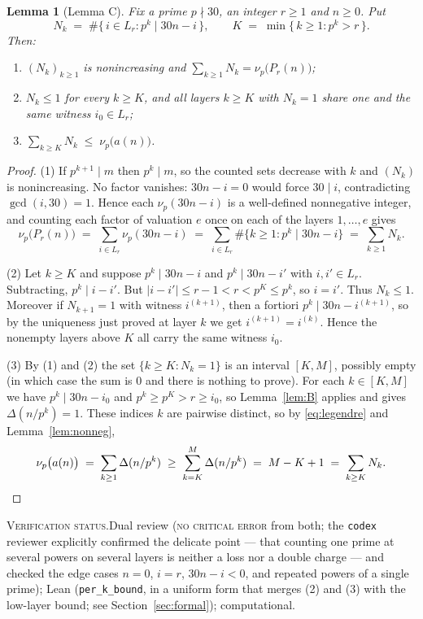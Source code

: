 \documentclass[11pt]{article}
\theoremstyle{plain}
\newtheorem{lemma}[theorem]{Lemma}
\theoremstyle{definition}
\theoremstyle{remark}
\numberwithin{equation}{section}
\newcommand{\Lr}{L_r}
\newcommand{\vstatus}[1]{%
  \par\vspace{3pt}\noindent
  {\small\textsc{Verification status.}\enspace #1}\par\vspace{3pt}}
\begin{document}
\begin{lemma}[Lemma C]
\label{lem:C}
Fix a prime $p \nmid 30$, an integer $r \ge 1$ and $n \ge 0$. Put
\[
  N_k \;=\; \#\{\, i \in \Lr : p^k \mid 30n - i \,\},
  \qquad
  K \;=\; \min\{\, k \ge 1 : p^k > r \,\} .
\]
Then:
\begin{enumerate}
\item $(N_k)_{k \ge 1}$ is nonincreasing and $\sum_{k \ge 1} N_k = \nu_p\bigl(P_r(n)\bigr)$;
\item $N_k \le 1$ for every $k \ge K$, and all layers $k \ge K$ with $N_k = 1$ share one and the
  same witness $i_0 \in \Lr$;
\item $\displaystyle \sum_{k \ge K} N_k \;\le\; \nu_p\bigl(a(n)\bigr)$.
\end{enumerate}
\end{lemma}

\begin{proof}
(1) If $p^{k+1} \mid m$ then $p^k \mid m$, so the counted sets decrease with $k$ and $(N_k)$ is
nonincreasing. No factor vanishes: $30n - i = 0$ would force $30 \mid i$, contradicting
$\gcd(i,30)=1$. Hence each $\nu_p(30n-i)$ is a well-defined nonnegative integer, and counting
each factor of valuation $e$ once on each of the layers $1,\dots,e$ gives
\[
  \nu_p\bigl(P_r(n)\bigr) \;=\; \sum_{i \in \Lr} \nu_p(30n - i)
  \;=\; \sum_{i \in \Lr} \#\{k \ge 1 : p^k \mid 30n - i\} \;=\; \sum_{k \ge 1} N_k .
\]

(2) Let $k \ge K$ and suppose $p^k \mid 30n - i$ and $p^k \mid 30n - i'$ with $i,i' \in \Lr$.
Subtracting, $p^k \mid i - i'$. But $|i - i'| \le r - 1 < r < p^K \le p^k$, so $i = i'$. Thus
$N_k \le 1$. Moreover if $N_{k+1} = 1$ with witness $i^{(k+1)}$, then a fortiori
$p^k \mid 30n - i^{(k+1)}$, so by the uniqueness just proved at layer $k$ we get
$i^{(k+1)} = i^{(k)}$. Hence the nonempty layers above $K$ all carry the same witness $i_0$.

(3) By (1) and (2) the set $\{k \ge K : N_k = 1\}$ is an interval $[K,M]$, possibly empty (in
which case the sum is $0$ and there is nothing to prove). For each $k \in [K,M]$ we have
$p^k \mid 30n - i_0$ and $p^k \ge p^K > r \ge i_0$, so Lemma~\ref{lem:B} applies and gives
$\Delta(n/p^k) = 1$. These indices $k$ are pairwise distinct, so by \eqref{eq:legendre} and
Lemma~\ref{lem:nonneg},
\[
  \nu_p\bigl(a(n)\bigr) \;=\; \sum_{k \ge 1} \Delta(n/p^k)
  \;\ge\; \sum_{k=K}^{M} \Delta(n/p^k) \;=\; M - K + 1 \;=\; \sum_{k \ge K} N_k . \qedhere
\]
\end{proof}
\vstatus{Dual review (\textsc{no critical error} from both; the \texttt{codex} reviewer explicitly
confirmed the delicate point --- that counting one prime at several powers on several layers is
neither a loss nor a double charge --- and checked the edge cases $n = 0$, $i = r$, $30n-i<0$,
and repeated powers of a single prime); Lean (\texttt{per\_k\_bound}, in a uniform form that
merges (2) and (3) with the low-layer bound; see Section~\ref{sec:formal}); computational.}
\end{document}
